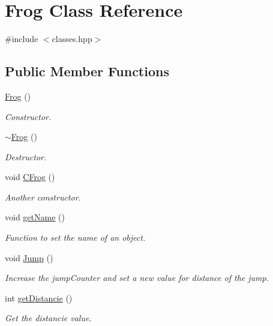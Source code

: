 \hypertarget{classFrog}{}\section{Frog Class Reference}
\label{classFrog}


{\ttfamily \#include $<$classes.\+hpp$>$}

\subsection*{Public Member Functions}
\begin{DoxyCompactItemize}
\item 
\hyperlink{classFrog_aca8f9a0c2bf409f2a0f876289881ede1}{Frog} ()
\begin{DoxyCompactList}\small\item\em Constructor. \end{DoxyCompactList}\item 
\hyperlink{classFrog_a03c9cd2a028e2466a3bfe5e9af1c12e7}{$\sim$\+Frog} ()
\begin{DoxyCompactList}\small\item\em Destructor. \end{DoxyCompactList}\item 
void \hyperlink{classFrog_ae3562aa740199bcc33f2316dc5982620}{C\+Frog} ()
\begin{DoxyCompactList}\small\item\em Another constructor. \end{DoxyCompactList}\item 
void \hyperlink{classFrog_aed2135d3c87ea38779a103904db1ac01}{get\+Name} ()
\begin{DoxyCompactList}\small\item\em Function to set the name of an object. \end{DoxyCompactList}\item 
void \hyperlink{classFrog_a7c7e8548354eb48bf7b7f9986e9b100c}{Jump} ()
\begin{DoxyCompactList}\small\item\em Increase the jump\+Counter and set a new value for distance of the jump. \end{DoxyCompactList}\item 
int \hyperlink{classFrog_a66fd9e0f17e71af3d08cf0ea40435eae}{get\+Distancie} ()
\begin{DoxyCompactList}\small\item\em Get the distancie value. \end{DoxyCompactList}\item 

\end{DoxyCompactItemize}
